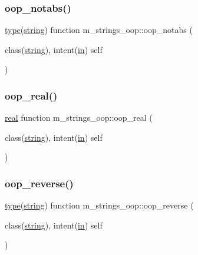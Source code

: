 \subsubsection{\texorpdfstring{oop\+\_\+notabs()}{oop\_notabs()}}
{\footnotesize\ttfamily \hyperlink{stop__watch_83_8txt_a70f0ead91c32e25323c03265aa302c1c}{type}(\hyperlink{structm__strings__oop_1_1string}{string}) function m\+\_\+strings\+\_\+oop\+::oop\+\_\+notabs (\begin{DoxyParamCaption}\item[{class(\hyperlink{structm__strings__oop_1_1string}{string}), intent(\hyperlink{M__journal_83_8txt_afce72651d1eed785a2132bee863b2f38}{in})}]{self }\end{DoxyParamCaption})\hspace{0.3cm}{\ttfamily [private]}}

\mbox{\label{namespacem__strings__oop_a9709a714bc825704651b00c7384a7547}} 
\subsubsection{\texorpdfstring{oop\+\_\+real()}{oop\_real()}}
{\footnotesize\ttfamily \hyperlink{read__watch_83_8txt_abdb62bde002f38ef75f810d3a905a823}{real} function m\+\_\+strings\+\_\+oop\+::oop\+\_\+real (\begin{DoxyParamCaption}\item[{class(\hyperlink{structm__strings__oop_1_1string}{string}), intent(\hyperlink{M__journal_83_8txt_afce72651d1eed785a2132bee863b2f38}{in})}]{self }\end{DoxyParamCaption})\hspace{0.3cm}{\ttfamily [private]}}

\mbox{\label{namespacem__strings__oop_ac3ab62e14d0b8445f51e084b810e2f76}} 
\subsubsection{\texorpdfstring{oop\+\_\+reverse()}{oop\_reverse()}}
{\footnotesize\ttfamily \hyperlink{stop__watch_83_8txt_a70f0ead91c32e25323c03265aa302c1c}{type}(\hyperlink{structm__strings__oop_1_1string}{string}) function m\+\_\+strings\+\_\+oop\+::oop\+\_\+reverse (\begin{DoxyParamCaption}\item[{class(\hyperlink{structm__strings__oop_1_1string}{string}), intent(\hyperlink{M__journal_83_8txt_afce72651d1eed785a2132bee863b2f38}{in})}]{self }\end{DoxyParamCaption})\hspace{0.3cm}{\ttfamily [private]}}

